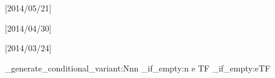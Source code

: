 \ifxetexorluatex
    \usepackage{polyglossia}[2014/05/21]        %
\else
    \usepackage{cmap}   %
    \usepackage{textcomp}
    \usepackage[T1,T2A]{fontenc}                    %
    \usepackage[utf8]{inputenc}[2014/04/30]         %
    \usepackage[english, russian]{babel}[2014/03/24]%
    \makeatletter\AtBeginDocument{\let\@elt\relax}\makeatother %
\fi

\indentafterchapter     %
\usepackage{indentfirst}

\usepackage[dvipsnames, table]{xcolor} %

\usepackage{longtable} %
\usepackage{multirow,makecell}   %
\usepackage{tabulary,tabularray} %
\ExplSyntaxOn%
\prg_generate_conditional_variant:Nnn \tl_if_empty:n { e } { TF }
\let \IfTokenListEmpty = \tl_if_empty:eTF
\ExplSyntaxOff

\usepackage{threeparttable}      %

